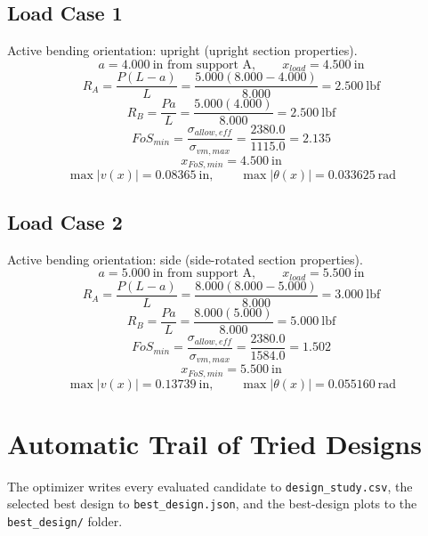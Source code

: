 \documentclass[11pt]{article}
\begin{document}
\subsection*{Load Case 1}
Active bending orientation: upright (upright section properties).
\[a = 4.000\ \mathrm{in} \text{ from support A}, \qquad x_{load} = 4.500\ \mathrm{in}\]
\[R_A = \frac{P(L-a)}{L} = \frac{5.000(8.000-4.000)}{8.000} = 2.500\ \mathrm{lbf}\]
\[R_B = \frac{Pa}{L} = \frac{5.000(4.000)}{8.000} = 2.500\ \mathrm{lbf}\]
\[FoS_{min} = \frac{\sigma_{allow,eff}}{\sigma_{vm,max}} = \frac{2380.0}{1115.0} = 2.135\]
\[x_{FoS,min} = 4.500\ \mathrm{in}\]
\[\max |v(x)| = 0.08365\ \mathrm{in}, \qquad \max |\theta(x)| = 0.033625\ \mathrm{rad}\]
\subsection*{Load Case 2}
Active bending orientation: side (side-rotated section properties).
\[a = 5.000\ \mathrm{in} \text{ from support A}, \qquad x_{load} = 5.500\ \mathrm{in}\]
\[R_A = \frac{P(L-a)}{L} = \frac{8.000(8.000-5.000)}{8.000} = 3.000\ \mathrm{lbf}\]
\[R_B = \frac{Pa}{L} = \frac{8.000(5.000)}{8.000} = 5.000\ \mathrm{lbf}\]
\[FoS_{min} = \frac{\sigma_{allow,eff}}{\sigma_{vm,max}} = \frac{2380.0}{1584.0} = 1.502\]
\[x_{FoS,min} = 5.500\ \mathrm{in}\]
\[\max |v(x)| = 0.13739\ \mathrm{in}, \qquad \max |\theta(x)| = 0.055160\ \mathrm{rad}\]

\section*{Automatic Trail of Tried Designs}
The optimizer writes every evaluated candidate to \texttt{design\_study.csv}, the selected best design to \texttt{best\_design.json}, and the best-design plots to the \texttt{best\_design/} folder.
\end{document}
